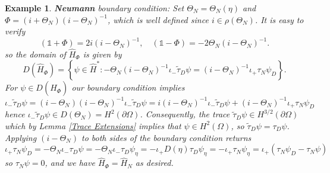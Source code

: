 \documentclass{article}
\numberwithin{equation}{section}
\newtheorem{example}{Example}[section]
\begin{document}
\begin{example}
    \textbf{Neumann} boundary condition: \em{Set $\Theta_N=\Theta_N(\eta)$ and $\Phi=(i + \Theta_N)(i- \Theta_N)^{-1}$, which is well defined since $i \in \rho(\Theta_N)$. It is easy to verify
    \begin{equation}\label{Phi Simplication}
        (\mathds{1}+\Phi)=2i (i-\Theta_N)^{-1}, \quad (\mathds{1}-\Phi)=-2\Theta_N (i-\Theta_N)^{-1}.
    \end{equation}
    so the domain of $\hat{H}_\Phi$ is given by
    \begin{equation}
        D(\hat{H}_{\Phi})= \left\{\psi \in \hat{H}^*: -\Theta_N (i- \Theta_N)^{-1}\iota_-\tilde{\tau}_D \psi=(i - \Theta_N)^{-1}\iota_+ \tau_N \psi_D \right\}.
    \end{equation}
    For $\psi \in D(\hat{H}_\Phi)$ our boundary condition implies
    \begin{equation}
    \iota_- \tilde{\tau}_D \psi=(i-\Theta_N)(i-\Theta_N)^{-1}\iota_-\tilde{\tau}_D\psi=i(i-\Theta_N)^{-1}\iota_-\tilde{\tau}_D\psi +(i-\Theta_N)^{-1}\iota_+\tau_N \psi_D\end{equation}
    hence $\iota_- \tilde{\tau}_D \psi \in D(\Theta_N)=H^2(\partial \Omega)$. Consequently, the trace  $\tilde{\tau}_D \psi \in H^{3/2}(\partial \Omega)$ which by Lemma \ref{Trace Extensions} implies that $\psi \in H^2(\Omega)$, so $\tilde{\tau}_D \psi= \tau_D \psi$.  Applying $(i- \Theta_N)$ to both sides of the boundary condition returns
    \begin{equation}
        \iota_+ \tau_N \psi_D= -\Theta_N \iota_- \tau_D \psi=-\Theta_N \iota_- \tau_D \psi_\eta=-\iota_+ D(\eta)\tau_D \psi_\eta=-\iota_+ \tau_N \psi_\eta=  \iota_+ (\tau_N \psi_D-\tau_N \psi)
    \end{equation}
    so $\tau_N \psi=0$, and we have $\hat{H}_\Phi= \hat{H}_N$ as desired.}
 \end{example}
\end{document}

